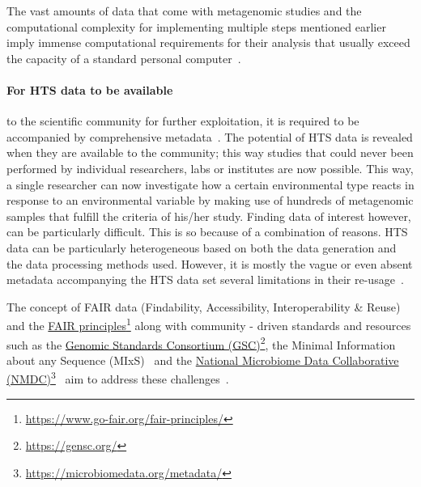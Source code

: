       The vast amounts of data that come with metagenomic studies and the computational complexity for implementing multiple steps mentioned earlier imply immense computational requirements for their analysis that usually exceed the capacity of a standard personal computer~\citep{merelli2014managing}. 

      \paragraph{For HTS data to be available }
      to the scientific community for further exploitation,
      it is required to be accompanied by
      comprehensive metadata~\citep{vangay2021microbiome}. 
      The potential of HTS data is revealed when they are available to the community; 
      this way studies that could never been performed
      by individual researchers, labs or institutes are now possible. 
      This way, 
      a single researcher can now investigate
      how a certain environmental type reacts in response to an environmental 
      variable by making use of hundreds of metagenomic samples 
      that fulfill the criteria of his/her study.
      Finding data of interest however, can be particularly difficult.
      This is so because of a combination of reasons.
      HTS data can be particularly heterogeneous based on both the data generation and the data processing methods used. 
      However, it is mostly the vague or even absent metadata accompanying the HTS data set several limitations in their re-usage~\citep{hu2022challenges}. 

      The concept of FAIR data (Findability, Accessibility, Interoperability \& Reuse)
      and the \href{https://www.go-fair.org/fair-principles/}{FAIR principles}\footnote{\href{https://www.go-fair.org/fair-principles/}{https://www.go-fair.org/fair-principles/}}
      along with community - driven standards and resources such as 
      the \href{https://gensc.org/}{Genomic Standards Consortium (GSC)}\footnote{\href{https://gensc.org/}{https://gensc.org/}},
      the Minimal Information about any Sequence (MIxS)~\citep{yilmaz2011minimum, yilmaz2011genomic}
      and the \href{https://microbiomedata.org/metadata/}{National Microbiome Data Collaborative (NMDC)}\footnote{\href{https://microbiomedata.org/metadata/}{https://microbiomedata.org/metadata/}}~\citep{wood2020national}
      aim to address these challenges~\citep{wilkinson2016fair}.

